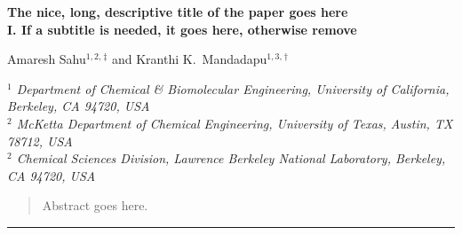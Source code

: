 \documentclass[11pt,twoside,notitlepage]{article}
\begin{document}

	\begin{center}
		{\textbf{
			\Large{The nice, long, descriptive title of the paper goes here}
		}} \\
		\vspace{0.11in}
		{\textbf{
			\large{I. If a subtitle is needed, it goes here, otherwise remove}
		}} \\
		\vspace{0.21in}

		{\small
			Amaresh Sahu$^{1,2,}$\hyperlink{email1}{$^{\ddag}$}
			and Kranthi K.\ Mandadapu$^{1,3,}$\hyperlink{email3}{$^{\dag}$} \\
		}
		\vspace{0.25in}

		\footnotesize{
			{
				\textit{$^1$
				Department of Chemical \& Biomolecular Engineering,
				University of California, Berkeley, CA 94720, USA}
				\\[3pt]
				\textit{$^2$
				McKetta Department of Chemical Engineering,
				University of Texas, Austin, TX 78712, USA}
				\\[3pt]
				\textit{$^2$
				Chemical Sciences Division,
				Lawrence Berkeley National Laboratory, Berkeley, CA 94720, USA}
				\\
			}
		}
	\end{center}



	\vspace{13pt}

	\begin{abstract}
		Abstract goes here.
		\lipsum[1]
	\end{abstract}
	\vspace{15pt}
				   



	\noindent\rule{4.6cm}{0.4pt}

	\small



	\normalsize
	\vspace{25pt}
\end{document}
